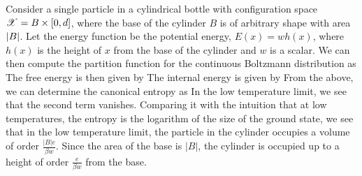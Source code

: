 \documentclass[letterpaper,english,10pt]{article}
\begin{document}
\begin{shaded*}
\begin{exmp}
Consider a single particle in a cylindrical bottle with configuration space $\mathscr{X} = B \times [0,d]$, where the base of the cylinder $B$ is of arbitrary shape with area $\left\lvert B\right\rvert$. 
Let the energy function be the potential energy, $E(x) = wh(x)$, where $h(x)$ is the height of $x$ from the base of the cylinder and $w$ is a scalar. 
We can then compute the partition function for the continuous Boltzmann distribution as
The free energy is then given by 
The internal energy is given by
From the above, we can determine the canonical entropy as
In the low temperature limit, we see that the second term vanishes. Comparing it with the intuition that at low temperatures, the entropy is the logarithm of the size of the ground state, we see that in the low temperature limit, the particle in the cylinder occupies a volume of order $\frac{|B|e}{\beta w}$. Since the area of the base is $|B|$, the cylinder is occupied up to a height of order $\frac{e}{\beta w}$ from the base.
\end{exmp}
\end{shaded*}
\end{document}
